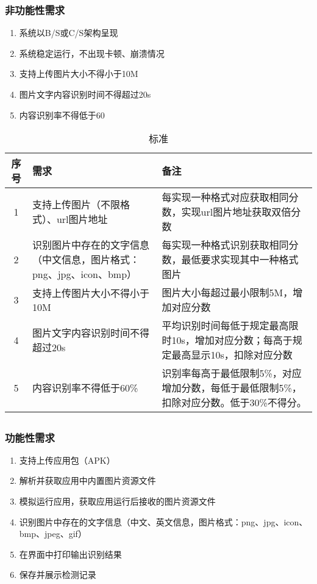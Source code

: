 \documentclass[UTF8]{ctexart}
\begin{document}
			\subsubsection{非功能性需求}
				\begin{enumerate}
					\item 系统以B/S或C/S架构呈现
					\item 系统稳定运行，不出现卡顿、崩溃情况
					\item 支持上传图片大小不得小于10M
					\item 图片文字内容识别时间不得超过20s
					\item 内容识别率不得低于60%
				\end{enumerate}
				\begin{table}
					\caption{标准}
					\centering
					\begin{tabular}{cp{5.5cm}p{5.5cm}}
						\toprule[1.5pt]
						\textbf{序号} & \textbf{需求} & \textbf{备注}\\
						\midrule[1pt]
						1 & 支持上传图片（不限格式）、url图片地址 & 每实现一种格式对应获取相同分数，实现url图片地址获取双倍分数\\
						2 & 识别图片中存在的文字信息（中文信息，图片格式：png、jpg、icon、bmp） & 每实现一种格式识别获取相同分数，最低要求实现其中一种格式图片\\
						3 & 支持上传图片大小不得小于10M & 图片大小每超过最小限制5M，增加对应分数\\
						4 & 图片文字内容识别时间不得超过20s & 平均识别时间每低于规定最高限时10s，增加对应分数；每高于规定最高显示10s，扣除对应分数\\
						5 & 内容识别率不得低于60\% & 识别率每高于最低限制5\%，对应增加分数，每低于最低限制5\%，扣除对应分数。低于30\%不得分。\\
 						\bottomrule[1.5pt]
					\end{tabular}
				\end{table}
		\subsection{}
			\subsubsection{功能性需求}
				\begin{enumerate}
					\item 支持上传应用包（APK）
					\item 解析并获取应用中内置图片资源文件
					\item 模拟运行应用，获取应用运行后接收的图片资源文件
					\item 识别图片中存在的文字信息（中文、英文信息，图片格式：png、jpg、icon、bmp、jpeg、gif）
					\item 在界面中打印输出识别结果
					\item 保存并展示检测记录
				\end{enumerate}
\end{document}

